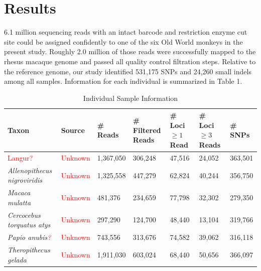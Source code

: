 \documentclass[12pt]{article}
\begin{document}

\section{Results}


6.1 million sequencing reads with an intact barcode and restriction enzyme cut site could be assigned confidently to one of the six Old World monkeys in the present study. Roughly 2.0 million of those reads were successfully mapped to the rhesus macaque genome and passed all quality control filtration steps. Relative to the reference genome, our study identified 531,175 SNPs and 24,260 small indels among all samples. Information for each individual is summarized in Table 1. 

\begin{table}[h]
\caption{Individual Sample Information}
\begin{center}
	\small
	\begin{tabular}{ p{3cm} || l || p{1.75cm} | p{1.75cm} || p{1.75cm} | p{1.75cm} | l }
		\hline
		Taxon & Source & \# Reads & \# Filtered Reads & \# Loci $\ge 1$ Read & \# Loci $\ge 3$ Reads & \# SNPs \\ \hline\hline
		\textcolor{red}{Langur?} & \textcolor{red}{Unknown} & 1,367,050 & 306,248 & 47,516 & 24,052 & 363,501 \\ \hline
		\emph{Allenopithecus nigroviridis} & \textcolor{red}{Unknown} & 1,325,558 & 447,279 & 62,824 & 40,244 & 356,750 \\ \hline
		\emph{Macaca mulatta} & \textcolor{red}{Unknown} & 481,376 & 234,659 & 77,798 & 32,302 & 279,350 \\ \hline
		\emph{Cercocebus torquatus atys} & \textcolor{red}{Unknown} & 297,290 & 124,700 & 48,440 & 13,104 & 319,766 \\ \hline
		\emph{Papio anubis\textcolor{red}{?}} & \textcolor{red}{Unknown} & 743,556 & 313,676 & 74,582 & 39,062 & 316,118 \\ \hline
		\emph{Theropithecus gelada} & \textcolor{red}{Unknown} & 1,911,030 & 603,024 & 68,440 & 50,656 & 366,097 \\
		\hline
	\end{tabular}
\end{center}
\end{table}
\end{document}
